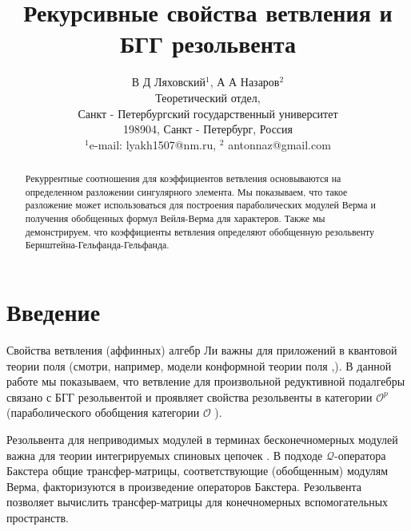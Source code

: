 \documentclass[12pt]{article}
\theoremstyle{definition}
\begin{document}
\title{Рекурсивные свойства ветвления и БГГ резольвента}
\author{В Д Ляховский$^1$, А А Назаров$^2$\\
Теоретический отдел,\\ Санкт - Петербургский государственный университет\\
198904, Санкт - Петербург, Россия\\
$^1$e-mail: lyakh1507@nm.ru, $^2$ antonnaz@gmail.com}

\maketitle

\begin{abstract}
Рекуррентные соотношения для коэффициентов ветвления основываются на определенном разложении сингулярного элемента. Мы показываем, что такое разложение может использоваться для построения параболических модулей Верма и получения обобщенных формул Вейля-Верма для характеров. Также мы демонстрируем, что коэффициенты ветвления определяют обобщенную резольвенту Бернштейна-Гельфанда-Гельфанда. 
\end{abstract}


\section{Введение}

\label{sec:introduction}
Свойства ветвления (аффинных) алгебр Ли важны для приложений в квантовой теории поля (смотри, например, модели конформной теории поля \cite{difrancesco1997cft},\cite{coquereaux2008conformal}). В данной работе мы показываем, что ветвление для произвольной редуктивной подалгебры связано с БГГ резольвентой и проявляет свойства резольвенты в категории $\mathcal{O}^{p}$ \cite{lepowsky1977generalization} (параболического обобщения категории $\mathcal{O}$ \cite{bernstein1976category}).

Резольвента для неприводимых модулей в терминах бесконечномерных модулей важна для теории интегрируемых спиновых цепочек \cite{derk1008}. В подходе  $\mathcal{Q}$-оператора Бакстера \cite{derk09} общие трансфер-матрицы, соответствующие (обобщенным) модулям Верма, факторизуются в произведение операторов Бакстера. Резольвента позволяет вычислить трансфер-матрицы для конечномерных вспомогательных пространств.
\end{document}
